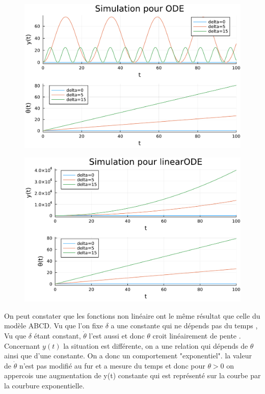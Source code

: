 \documentclass[11pt,a4paper]{article}
\begin{document}
\begin{figure}[!h]
	\centering
	\includegraphics[width=0.95\linewidth]{../code/jlplots/Q1_7_ODE.pdf}
\end{figure}
\begin{figure}[!h]
	\centering
	\includegraphics[width=0.95\linewidth]{../code/jlplots/Q1_7_linearODE.pdf}
\end{figure}
On peut constater que les fonctions non linéaire ont le même résultat que celle du modèle ABCD.
Vu que l'on fixe $\delta$ a une constante qui ne dépends pas du temps , 
Vu que $\delta$ étant constant, $\dot \theta$ l'est aussi et donc $\theta$ croit linéairement de pente . \\
Concernant $y(t)$ la situation est différente, on a une relation qui dépends de $\theta$ ainsi que d'une constante. On a donc un comportement "exponentiel".
la valeur de $\dot \theta$ n'est pas modifié au fur et a mesure du temps et donc pour $\theta>0 $ on appercois une augmentation de y(t) constante qui est représenté sur la courbe par la courbure exponentielle.
\end{document}
